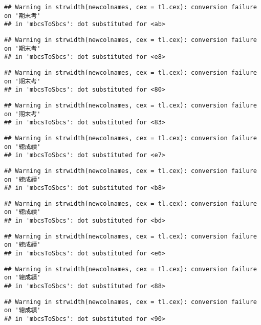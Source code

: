 \documentclass[
]{book}
\begin{document}
\begin{verbatim}
## Warning in strwidth(newcolnames, cex = tl.cex): conversion failure on '期末考'
## in 'mbcsToSbcs': dot substituted for <ab>
\end{verbatim}

\begin{verbatim}
## Warning in strwidth(newcolnames, cex = tl.cex): conversion failure on '期末考'
## in 'mbcsToSbcs': dot substituted for <e8>
\end{verbatim}

\begin{verbatim}
## Warning in strwidth(newcolnames, cex = tl.cex): conversion failure on '期末考'
## in 'mbcsToSbcs': dot substituted for <80>
\end{verbatim}

\begin{verbatim}
## Warning in strwidth(newcolnames, cex = tl.cex): conversion failure on '期末考'
## in 'mbcsToSbcs': dot substituted for <83>
\end{verbatim}

\begin{verbatim}
## Warning in strwidth(newcolnames, cex = tl.cex): conversion failure on '總成績'
## in 'mbcsToSbcs': dot substituted for <e7>
\end{verbatim}

\begin{verbatim}
## Warning in strwidth(newcolnames, cex = tl.cex): conversion failure on '總成績'
## in 'mbcsToSbcs': dot substituted for <b8>
\end{verbatim}

\begin{verbatim}
## Warning in strwidth(newcolnames, cex = tl.cex): conversion failure on '總成績'
## in 'mbcsToSbcs': dot substituted for <bd>
\end{verbatim}

\begin{verbatim}
## Warning in strwidth(newcolnames, cex = tl.cex): conversion failure on '總成績'
## in 'mbcsToSbcs': dot substituted for <e6>
\end{verbatim}

\begin{verbatim}
## Warning in strwidth(newcolnames, cex = tl.cex): conversion failure on '總成績'
## in 'mbcsToSbcs': dot substituted for <88>
\end{verbatim}

\begin{verbatim}
## Warning in strwidth(newcolnames, cex = tl.cex): conversion failure on '總成績'
## in 'mbcsToSbcs': dot substituted for <90>
\end{verbatim}
\end{document}
